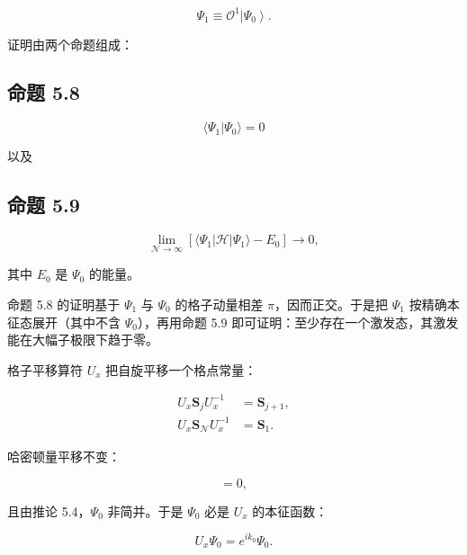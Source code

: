\begin{equation*}
\Psi_ {1} \equiv \mathcal {O} ^ {1} \left| \Psi_ {0} \right\rangle .
\tag{5.40}
\end{equation*}

证明由两个命题组成：

\subsection*{命题 5.8}

\begin{equation*}
\langle \Psi_ {1} | \Psi_ {0} \rangle = 0
\tag{5.41}
\end{equation*}

以及

\subsection*{命题 5.9}

\begin{equation*}
\lim _ {\mathcal {N} \to \infty} \left[ \langle \Psi_ {1} | \mathcal {H} | \Psi_ {1} \rangle - E _ {0} \right] \to 0 ,
\tag{5.42}
\end{equation*}

其中 $E_0$ 是 $\Psi_0$ 的能量。

命题 5.8 的证明基于 $\Psi_{1}$ 与 $\Psi_{0}$ 的格子动量相差 $\pi$，因而正交。于是把 $\Psi_{1}$ 按精确本征态展开（其中不含 $\Psi_{0}$），再用命题 5.9 即可证明：至少存在一个激发态，其激发能在大幅子极限下趋于零。

格子平移算符 $U_{x}$ 把自旋平移一个格点常量：

\begin{align*}
U _ {x} \mathbf {S} _ {j} U _ {x} ^ {- 1} & = \mathbf {S} _ {j + 1} ,\\
U _ {x} \mathbf {S} _ {\mathcal {N}} U _ {x} ^ {- 1} & = \mathbf {S} _ {1} .
\tag{5.43}
\end{align*}

哈密顿量平移不变：

\begin{equation*}
[ \mathcal {H}, U _ {x} ] = 0 ,
\tag{5.44}
\end{equation*}

且由推论 5.4，$\Psi_0$ 非简并。于是 $\Psi_0$ 必是 $U_x$ 的本征函数：

\begin{equation*}
U _ {x} \Psi_ {0} = e ^ {i k _ {0}} \Psi_ {0}.
\tag{5.45}
\end{equation*}

